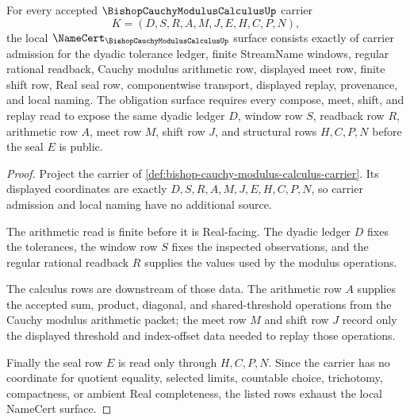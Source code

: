\begin{theorem}
\label{thm:bishop-cauchy-modulus-calculus-namecert-obligations}
For every accepted $\BishopCauchyModulusCalculusUp$ carrier
$$
K=(D,S,R,A,M,J,E,H,C,P,N),
$$
the local $\NameCert_{\BishopCauchyModulusCalculusUp}$ surface consists exactly of carrier admission for the dyadic tolerance ledger, finite StreamName windows, regular rational readback, Cauchy modulus arithmetic row, displayed meet row, finite shift row, Real seal row, componentwise transport, displayed replay, provenance, and local naming. The obligation surface requires every compose, meet, shift, and replay read to expose the same dyadic ledger $D$, window row $S$, readback row $R$, arithmetic row $A$, meet row $M$, shift row $J$, and structural rows $H,C,P,N$ before the seal $E$ is public.
\end{theorem}
\begin{proof}
Project the carrier of \autoref{def:bishop-cauchy-modulus-calculus-carrier}. Its displayed coordinates are exactly $D,S,R,A,M,J,E,H,C,P,N$, so carrier admission and local naming have no additional source.

The arithmetic read is finite before it is Real-facing. The dyadic ledger $D$ fixes the tolerances, the window row $S$ fixes the inspected observations, and the regular rational readback $R$ supplies the values used by the modulus operations.

The calculus rows are downstream of those data. The arithmetic row $A$ supplies the accepted sum, product, diagonal, and shared-threshold operations from the Cauchy modulus arithmetic packet; the meet row $M$ and shift row $J$ record only the displayed threshold and index-offset data needed to replay those operations.

Finally the seal row $E$ is read only through $H,C,P,N$. Since the carrier has no coordinate for quotient equality, selected limits, countable choice, trichotomy, compactness, or ambient Real completeness, the listed rows exhaust the local NameCert surface.
\end{proof}

